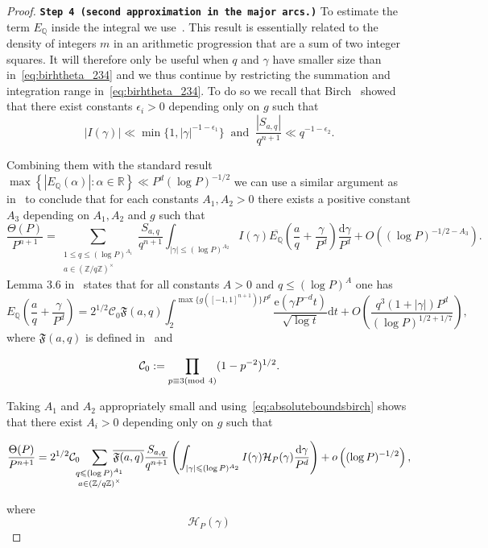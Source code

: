 \documentclass[a4paper,12pt,reqno]{amsart}
\numberwithin{equation}{section} \numberwithin{figure}{section}
\newcommand\Z{\mathbb{Z}}
\newcommand\Q{\mathbb{Q}}
\newcommand\R{\mathbb{R}}
\newcommand{\md}[1]{  \left(\textnormal{mod}\ #1\right)}
\renewcommand{\l}{\left}
\renewcommand{\r}{\right}
\renewcommand{\c}{\mathcal}
\renewcommand{\leq}{\leqslant}
\renewcommand{\#}{\sharp}
\theoremstyle{definition}
\numberwithin{lemma}{section}
\newcommand{\beq}[2]
{
\begin{equation}
\label{#1}
{#2}
\end{equation}
}
\begin{document}
\begin{proof}
\textbf{\texttt{Step 4 (second approximation in the major arcs.)}}
To estimate the term $E_\Q$ inside the integral we use~\cite[Lemma 3.6]{MR4353917}. This  result 
is essentially related to  the   density of integers $m$ in an arithmetic progression that are a sum of two integer squares.
It   will therefore only be useful when $q$ and $\gamma$ have smaller size than in~\eqref{eq:birhtheta_234}
and we thus continue by   restricting the summation and integration range in~\eqref{eq:birhtheta_234}.
To do so we recall  that 
Birch~\cite[Lemmas 5.2 \& 5.4]{Bir62}
showed that there exist constants $\epsilon_i>0$ 
depending only on $g $ such that \beq{eq:absoluteboundsbirch}{
|I(\gamma)| \ll \min\{1,|\gamma|^{-1-\epsilon_1}\}
\ \textrm{ and } \ 
\frac{|S_{a,q}| }{q^{n+1}}\ll q^{-1-\epsilon_2} .}
Combining them with 
the standard result $\max \left\{ |E_\Q(\alpha)|: \alpha \in \R \right\} \ll P^d (\log P)^{-1/2}$
we can use a similar argument as in~\cite[Lemma 4.2]{MR4353917}
to conclude that for each  
constants $A_1,A_2>0$
there exists
a positive constant $A_3$ depending on 
$A_1,A_2$ and $g $ such that $$
\frac{ \Theta(P)}{ P^{n+1}}=
 \sum_{\substack{ 1\leq  q \leq (\log P)^{ A_1}\\
 a\in (\Z/q\Z)^\times   }} \frac{S_{a,q}}{q^{n+1} } 
  \int_{|\gamma|\leq (\log P)^{ A_2}} 
I(\gamma)
\overline{E_\Q}
\left(\frac{a}{q}+\frac{ \gamma}{P^d}\right)
\frac{\mathrm d \gamma}{P^d}
+O\l( (\log P)^{-1/2-A_3}\r).$$
Lemma 3.6 in~\cite{MR4353917}
states   that for all constants $A>0$ and $q\leq (\log P)^A$ one has
$$
E_\Q\left(\frac{a}{q}+\frac{ \gamma}{P^d}\right)
=2^{1/2} \c C_0 \mathfrak F(a,q)
\int_{2}^{\max\{g([-1,1]^{n+1} )\} P^d} \frac{\mathrm e(\gamma P^{-d} t ) }{\sqrt{\log t } }\mathrm dt 
+O\left(\frac{q^3(1+|\gamma|)P^d}{(\log P)^{1/2+1/7}}\right)
,$$ where  $  \mathfrak F(a,q)  $ is defined in~\cite[Equation (3.7)]{MR4353917} and
\beq{def:standc0}{ \c C_0:= \prod_{p\equiv 3 \md 4 }(1-p^{-2})^{1/2}.}
Taking $A_1$ and $A_2$ appropriately small and using~\eqref{eq:absoluteboundsbirch}
shows that there exist $A_i>0$ depending only on $g$
such that 
\beq{eq:bb01}{
\frac{ \Theta(P)}{ P^{n+1}}=
 2^{1/2} \c C_0
\hspace{-0,2cm}
 \sum_{\substack{    q \leq (\log P)^{ A_1}\\
 a\in (\Z/q\Z)^\times   }} 
\hspace{-0,4cm}
\overline{ \mathfrak F(a,q)}
\frac{S_{a,q}}{q^{n+1} } 
\l(\int_{|\gamma|\leq (\log P)^{ A_2}} 
I(\gamma) 
\c H_P(\gamma) 
\frac{\mathrm d \gamma}{P^d}
\r)
+o\l( (\log P)^{-1/2}\r),}
where   $$
\c H_P(\gamma) 
$$
\end{proof}
\end{document}
